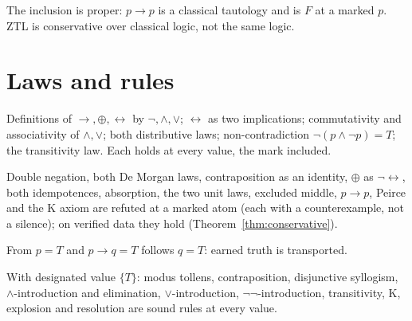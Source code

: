 \begin{theorem}\label{thm:notconversely}
  \leanok
  The inclusion is proper: $p\to p$ is a classical tautology and is $F$ at a
  marked $p$. ZTL is conservative over classical logic, not the same logic.
\end{theorem}

\chapter{Laws and rules}\label{chap:laws}

\begin{theorem}\label{thm:laws12}
  \leanok
  Definitions of $\to,\oplus,\leftrightarrow$ by $\neg,\wedge,\vee$;
  $\leftrightarrow$ as two implications; commutativity and associativity of
  $\wedge,\vee$; both distributive laws; non-contradiction
  $\neg(p\wedge\neg p)=T$; the transitivity law. Each holds at every value,
  the mark included.
\end{theorem}

\begin{theorem}\label{thm:laws14}
  \leanok
  Double negation, both De Morgan laws, contraposition as an identity,
  $\oplus$ as $\neg\leftrightarrow$, both idempotences, absorption, the two
  unit laws, excluded middle, $p\to p$, Peirce and the K axiom are refuted at a
  marked atom (each with a counterexample, not a silence); on verified data
  they hold (Theorem~\ref{thm:conservative}).
\end{theorem}

\begin{theorem}\label{thm:mp}
  \leanok
  From $p=T$ and $p\to q=T$ follows $q=T$: earned truth is transported.
\end{theorem}

\begin{theorem}\label{thm:rules}
  \leanok
  With designated value $\{T\}$: modus tollens, contraposition, disjunctive
  syllogism, $\wedge$-introduction and elimination, $\vee$-introduction,
  $\neg\neg$-introduction, transitivity, K, explosion and resolution are sound
  rules at every value.
\end{theorem}

